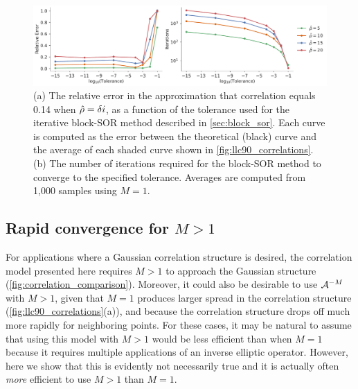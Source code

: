 \begin{figure}
    \centering
    \includegraphics[width=\textwidth]{../figures/matern_llc90_error_and_iters_01apps.pdf}
    \caption{(a) The relative error in the approximation that correlation equals
        0.14 when $\hat{\rho}=\delta i$, as a function of the tolerance used
        for the iterative block-SOR method described in \cref{sec:block_sor}.
        Each curve is computed as the error between the theoretical (black)
        curve and the average of each shaded curve shown in \cref{fig:llc90_correlations}.
        (b) The number of iterations required for the block-SOR method to
        converge to the specified tolerance.
        Averages are computed from 1,000 samples using $M=1$.
    }
    \label{fig:error_and_iters}
\end{figure}

\subsection{Rapid convergence for $M>1$}
\label{ssec:iters_and_apps}

For applications where a Gaussian correlation structure is desired, the
correlation model presented here requires $M>1$ to approach the Gaussian
structure (\cref{fig:correlation_comparison}).
Moreover, it could also be desirable to use $\mathcal{A}^{-M}$ with $M>1$,
given that $M=1$ produces larger spread in the correlation structure
(\cref{fig:llc90_correlations}(a)), and because the correlation structure drops
off much more rapidly for neighboring points.
For these cases, it may be natural to assume that using this model with $M>1$
would be less efficient than when $M=1$ because it requires multiple
applications of an inverse elliptic operator.
However, here we show that this is evidently not necessarily true and it is
actually often \textit{more} efficient to use $M>1$ than $M=1$.

